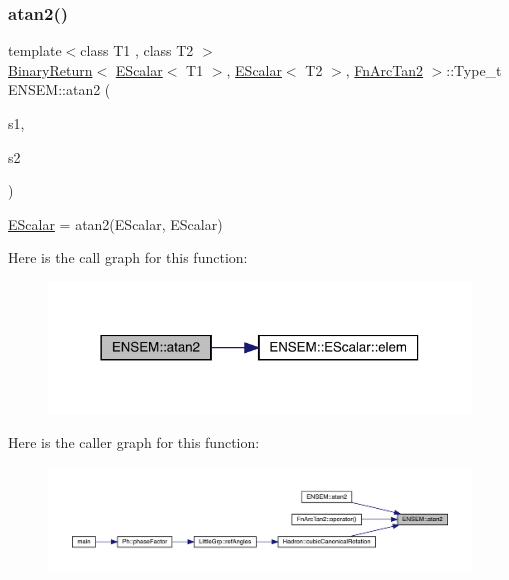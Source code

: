 \subsubsection{\texorpdfstring{atan2()}{atan2()}}
{\footnotesize\ttfamily template$<$class T1 , class T2 $>$ \\
\mbox{\hyperlink{structENSEM_1_1BinaryReturn}{Binary\+Return}}$<$ \mbox{\hyperlink{classENSEM_1_1EScalar}{E\+Scalar}}$<$ T1 $>$, \mbox{\hyperlink{classENSEM_1_1EScalar}{E\+Scalar}}$<$ T2 $>$, \mbox{\hyperlink{structENSEM_1_1FnArcTan2}{Fn\+Arc\+Tan2}} $>$\+::Type\+\_\+t E\+N\+S\+E\+M\+::atan2 (\begin{DoxyParamCaption}\item[{const \mbox{\hyperlink{classENSEM_1_1EScalar}{E\+Scalar}}$<$ T1 $>$ \&}]{s1,  }\item[{const \mbox{\hyperlink{classENSEM_1_1EScalar}{E\+Scalar}}$<$ T2 $>$ \&}]{s2 }\end{DoxyParamCaption})\hspace{0.3cm}{\ttfamily [inline]}}



\mbox{\hyperlink{classENSEM_1_1EScalar}{E\+Scalar}} = atan2(\+E\+Scalar, E\+Scalar) 

Here is the call graph for this function\+:\nopagebreak
\begin{figure}[H]
\begin{center}
\leavevmode
\includegraphics[width=318pt]{d4/dca/group__escalar_ga9a9d48948d119981259ad0ebcb0acfea_cgraph}
\end{center}
\end{figure}
Here is the caller graph for this function\+:
\nopagebreak
\begin{figure}[H]
\begin{center}
\leavevmode
\includegraphics[width=350pt]{d4/dca/group__escalar_ga9a9d48948d119981259ad0ebcb0acfea_icgraph}
\end{center}
\end{figure}
\mbox{\label{group__escalar_ga1fe36c2ff072b322fac723a4e44f6584}} 
